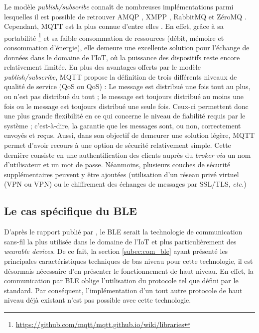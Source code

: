 Le modèle \textit{publish/subscribe} connaît de nombreuses implémentations parmi lesquelles il est possible de retrouver \ac{AMQP} \citep{Vinoski2006}, \ac{XMPP} \citep{Saint-Andre2011}, RabbitMQ \citep{Dossot2014} et ZéroMQ \citep{Hintjens2013}. Cependant, \ac{MQTT} est la plus connue d'entre elles \citep{Hunkeler2008}. En effet, grâce à sa portabilité \footnote{\url{https://github.com/mqtt/mqtt.github.io/wiki/libraries}} et sa faible consommation de ressources (débit, mémoire et consommation d'énergie), elle demeure une excellente solution pour l'échange de données dans le domaine de l'\acs{IoT}, où la puissance des dispositifs reste encore relativement limitée. En plus des avantages offerts par le modèle \textit{publish/subscribe}, \acs{MQTT} propose la définition de trois différents niveaux de qualité de service (\acl{QoS} ou \acs{QoS}) : Le message est distribué une fois tout au plus, ou n'est pas distribué du tout ; le message est toujours distribué au moins une fois ou le message est toujours distribué une seule fois. Ceux-ci permettent donc une plus grande flexibilité en ce qui concerne le niveau de fiabilité requis par le système ; c'est-à-dire, la garantie que les messages sont, ou non, correctement envoyés et reçus. Aussi, dans son objectif de demeurer une solution légère, \acs{MQTT} permet d'avoir recours à une option de sécurité relativement simple. Cette dernière consiste en une authentification des clients auprès du \textit{broker} \textit{via} un nom d'utilisateur et un mot de passe. Néanmoins, plusieurs couches de sécurité supplémentaires peuvent y être ajoutées (utilisation d'un réseau privé virtuel (\acl{VPN} ou \acs{VPN}) ou le chiffrement des échanges de messages par \acs{SSL}/\acs{TLS}, \textit{etc.})

\subsection{Le cas spécifique du \acs{BLE}}

D'après le rapport publié par \cite{ON2017}, le \ac{BLE} serait la technologie de communication sans-fil la plus utilisée dans le domaine de l'\acs{IoT} et plus particulièrement des \textit{wearable devices}. De ce fait, la section \ref{subec:com_ble} ayant présenté les principales caractéristiques techniques de bas niveau pour cette technologie, il est désormais nécessaire d'en présenter le fonctionnement de haut niveau. En effet, la communication par \acs{BLE} oblige l'utilisation du protocole tel que défini par le standard. Par conséquent, l'implémentation d'un tout autre protocole de haut niveau déjà existant n'est pas possible avec cette technologie.

